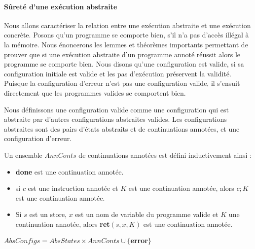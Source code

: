 \documentclass[11pt,openany]{article}
\begin{document}
			\paragraph{S\^uret\'e d'une ex\'ecution abstraite}
		Nous allons caract\'eriser la relation entre une ex\'ecution abstraite et une ex\'ecution concr\`ete. Posons qu'un programme se comporte bien, s'il n'a pas d'acc\`es ill\'egal \`a la m\'emoire. Nous \'enoncerons les lemmes et th\'eor\`emes importants permettant de prouver que si une ex\'ecution abstraite d'un programme annot\'e r\'eussit alors le programme se comporte bien. Nous disons qu'une configuration est valide, si sa configuration initiale est valide et les pas d'ex\'ecution pr\'eservent la validit\'e. Puisque la configuration d'erreur n'est pas une configuration valide, il s'ensuit directement que les programmes valides se comportent bien.\par
		Nous d\'efinissons une configuration valide comme une configuration qui est abstraite par d'autres configurations abstraites valides. Les configurations abstraites sont des pairs d'\'etats abstraits et de continuations annot\'ees, et une configuration d'erreur. \par 
		Un ensemble $AnnConts$ de continuations annot\'ees est d\'efini inductivement ainsi :\par 
		\begin{itemize}
		\item \textbf{done} est une continuation annot\'ee.
		\item si $c$ est une instruction annot\'ee et $K$ est une continuation annot\'ee, alors $c;K$ est une continuation annot\'ee.
		\item Si $s$ est un store, $x$ est un nom de variable du programme valide et $K$ une continuation annot\'ee, alors \textbf{ret}$(s,x,K)$ est une continuation annot\'ee.
		\end{itemize}
		
		\begin{center}
		$AbsConfigs = AbsStates \times AnnConts \cup \{$\textbf{error}$\}$
		\end{center}
		
\end{document}
